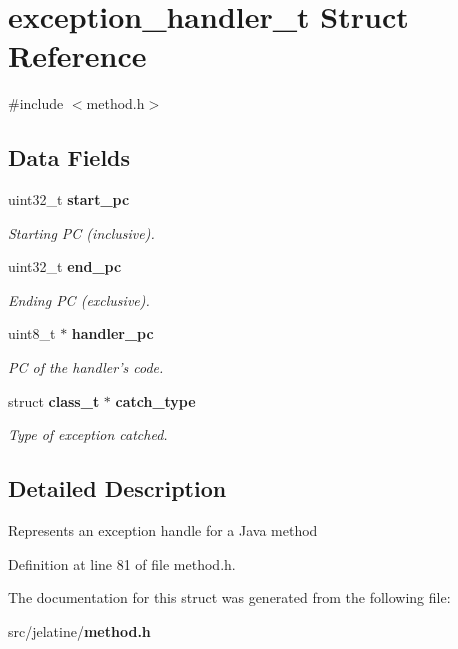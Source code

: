 \section{exception\_\-handler\_\-t Struct Reference}
\label{structexception__handler__t}


{\ttfamily \#include $<$method.h$>$}

\subsection*{Data Fields}
\begin{DoxyCompactItemize}
\item 
uint32\_\-t {\bf start\_\-pc}\label{structexception__handler__t_aa8b03ddf04878db7113ac87bb4ced58b}

\begin{DoxyCompactList}\small\item\em Starting PC (inclusive). \item\end{DoxyCompactList}\item 
uint32\_\-t {\bf end\_\-pc}\label{structexception__handler__t_a8dfb60d3569cf69c09e72821e475b241}

\begin{DoxyCompactList}\small\item\em Ending PC (exclusive). \item\end{DoxyCompactList}\item 
uint8\_\-t $\ast$ {\bf handler\_\-pc}\label{structexception__handler__t_a145ac74b98ea231df4ddf20fd57087aa}

\begin{DoxyCompactList}\small\item\em PC of the handler's code. \item\end{DoxyCompactList}\item 
struct {\bf class\_\-t} $\ast$ {\bf catch\_\-type}\label{structexception__handler__t_a18fc7076489195e4530e64625242e010}

\begin{DoxyCompactList}\small\item\em Type of exception catched. \item\end{DoxyCompactList}\end{DoxyCompactItemize}


\subsection{Detailed Description}
Represents an exception handle for a Java method 

Definition at line 81 of file method.h.



The documentation for this struct was generated from the following file:\begin{DoxyCompactItemize}
\item 
src/jelatine/{\bf method.h}\end{DoxyCompactItemize}
